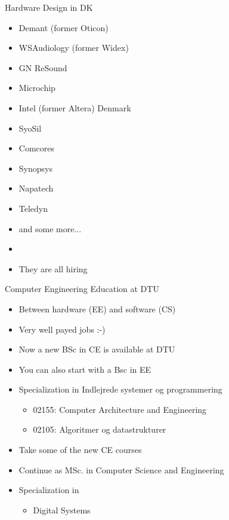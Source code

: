 \begin{frame}[fragile]{Hardware Design in DK}
\begin{itemize}
\item Demant (former Oticon)
\item WSAudiology (former Widex)
\item GN ReSound
\item Microchip
\item Intel (former Altera) Denmark
\item SyoSil
\item Comcores
\item Synopsys
\item Napatech
\item Teledyn
\item and some more...
\item 
\item They are all hiring
\end{itemize}
\end{frame}


\begin{frame}[fragile]{Computer Engineering Education at DTU}
\begin{itemize}
\item Between hardware (EE) and software (CS)
\item Very well payed jobs :-)
\item Now a new BSc in CE is available at DTU
\item You can also start with a Bsc in EE
\item Specialization in Indlejrede systemer og programmering
\begin{itemize}
\item 02155: Computer Architecture and Engineering
\item 02105: Algoritmer og datastrukturer
\end{itemize}
\item Take some of the new CE courses
\item Continue as MSc. in Computer Science and Engineering
\item Specialization in
\begin{itemize}
\item Digital Systems
\end{itemize}
\end{itemize}
\end{frame}

